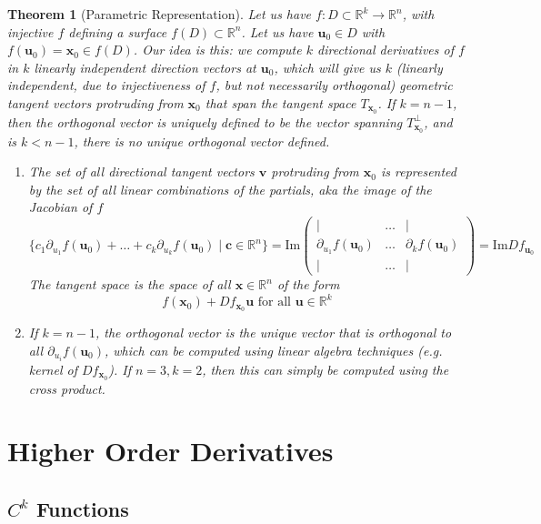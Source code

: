 \documentclass{article}
\newtheorem{theorem}{Theorem}[section]
\theoremstyle{remark}
\theoremstyle{definition}
\begin{document}
\begin{theorem}[Parametric Representation]
Let us have $f: D \subset \mathbb{R}^k \longrightarrow \mathbb{R}^n$, with injective $f$ defining a surface $f(D) \subset \mathbb{R}^n$. Let us have $\mathbf{u}_0 \in D$ with $f(\mathbf{u}_0) = \mathbf{x}_0 \in f(D)$. Our idea is this: we compute $k$ directional derivatives of $f$ in $k$ linearly independent direction vectors at $\mathbf{u}_0$, which will give us $k$ (linearly independent, due to injectiveness of $f$, but not necessarily orthogonal) geometric tangent vectors protruding from $\mathbf{x}_0$ that span the tangent space $T_{\mathbf{x}_0}$. If $k = n-1$, then the orthogonal vector is uniquely defined to be the vector spanning $T_{\mathbf{x}_0}^\perp$, and is $k < n-1$, there is no unique orthogonal vector defined. 
\begin{enumerate}
    \item The set of all directional tangent vectors $\mathbf{v}$ protruding from $\mathbf{x}_0$ is represented by the set of all linear combinations of the partials, aka the image of the Jacobian of $f$
    \[\{c_1 \partial_{u_1} f (\mathbf{u}_0) + \ldots + c_k \partial_{u_k} f (\mathbf{u}_0) \mid \mathbf{c} \in \mathbb{R}^n\} = \mathrm{Im} \begin{pmatrix} \vert & \ldots & \vert \\ \partial_{u_1} f (\mathbf{u}_0) & \ldots & \partial_{k} f (\mathbf{u}_0) \\ \vert & \ldots & \vert \end{pmatrix} = \mathrm{Im} D f_{\mathbf{u}_0}\]
    The tangent space is the space of all $\mathbf{x} \in \mathbb{R}^n$ of the form 
    \[f(\mathbf{x}_0) + D f_{\mathbf{x}_0} \mathbf{u} \text{ for all } \mathbf{u} \in \mathbb{R}^k\]
    \item If $k=n-1$, the orthogonal vector is the unique vector that is orthogonal to all $\partial_{u_i} f(\mathbf{u}_0)$, which can be computed using linear algebra techniques (e.g. kernel of $D f_{\mathbf{x}_0}$). If $n=3, k=2$, then this can simply be computed using the cross product. 
\end{enumerate}
\end{theorem}

\section{Higher Order Derivatives}

\subsection[Ck Functions]{$C^k$ Functions}
\end{document}
